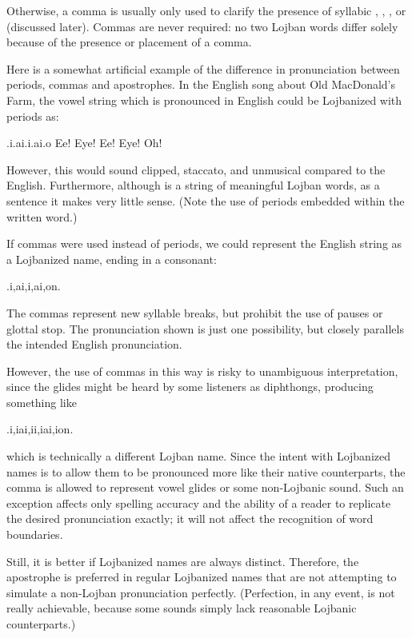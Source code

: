 Otherwise, a comma is usually only used to clarify the presence of syllabic , , , or  (discussed later). Commas are never required: no two Lojban words differ solely because of the presence or placement of a comma.

Here is a somewhat artificial example of the difference in pronunciation between periods, commas and apostrophes. In the English song about Old MacDonald's Farm, the vowel string which is pronounced  in English could be Lojbanized with periods as:
\begin{example}
.i.ai.i.ai.o\n
{}\n
Ee! Eye! Ee! Eye! Oh!
\end{example}

However, this would sound clipped, staccato, and unmusical compared to the English. Furthermore, although  is a string of meaningful Lojban words, as a sentence it makes very little sense. (Note the use of periods embedded within the written word.)

If commas were used instead of periods, we could represent the English string as a Lojbanized name, ending in a consonant:
\begin{example}
.i,ai,i,ai,on.\n
{}
\end{example}

The commas represent new syllable breaks, but prohibit the use of pauses or glottal stop. The pronunciation shown is just one possibility, but closely parallels the intended English pronunciation.

However, the use of commas in this way is risky to unambiguous interpretation, since the glides might be heard by some listeners as diphthongs, producing something like
\begin{example}
.i,iai,ii,iai,ion.
\end{example}

{\noindent}which is technically a different Lojban name. Since the intent with Lojbanized names is to allow them to be pronounced more like their native counterparts, the comma is allowed to represent vowel glides or some non-Lojbanic sound. Such an exception affects only spelling accuracy and the ability of a reader to replicate the desired pronunciation exactly; it will not affect the recognition of word boundaries. 

Still, it is better if Lojbanized names are always distinct. Therefore, the apostrophe is preferred in regular Lojbanized names that are not attempting to simulate a non-Lojban pronunciation perfectly. (Perfection, in any event, is not really achievable, because some sounds simply lack reasonable Lojbanic counterparts.)

